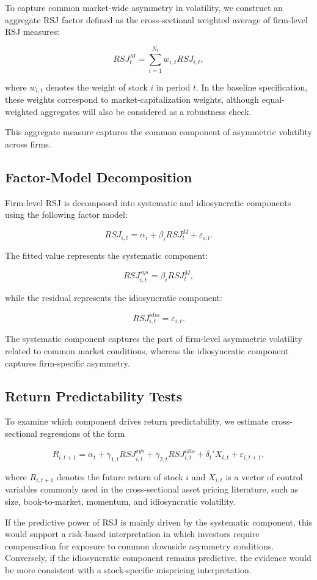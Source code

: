 \documentclass[11pt]{article}
\begin{document}
To capture common market-wide asymmetry in volatility, we construct an
aggregate RSJ factor defined as the cross-sectional weighted average
of firm-level RSJ measures:

\[
RSJ^M_t =
\sum_{i=1}^{N_t}
w_{i,t} RSJ_{i,t},
\]

where $w_{i,t}$ denotes the weight of stock $i$ in period $t$.
In the baseline specification, these weights correspond to
market-capitalization weights, although equal-weighted aggregates will
also be considered as a robustness check.

This aggregate measure captures the common component of asymmetric
volatility across firms.

\subsection{Factor-Model Decomposition}

Firm-level RSJ is decomposed into systematic and idiosyncratic
components using the following factor model:

\[
RSJ_{i,t} =
\alpha_i +
\beta_i RSJ^M_t +
\varepsilon_{i,t}.
\]

The fitted value represents the systematic component:

\[
RSJ^{sys}_{i,t} =
\beta_i RSJ^M_t,
\]

while the residual represents the idiosyncratic component:

\[
RSJ^{idio}_{i,t} =
\varepsilon_{i,t}.
\]

The systematic component captures the part of firm-level asymmetric
volatility related to common market conditions, whereas the
idiosyncratic component captures firm-specific asymmetry.

\subsection{Return Predictability Tests}

To examine which component drives return predictability, we estimate
cross-sectional regressions of the form

\[
R_{i,t+1} =
\alpha_t +
\gamma_{1,t} RSJ^{sys}_{i,t} +
\gamma_{2,t} RSJ^{idio}_{i,t} +
\delta_t' X_{i,t} +
\varepsilon_{i,t+1},
\]

where $R_{i,t+1}$ denotes the future return of stock $i$ and $X_{i,t}$
is a vector of control variables commonly used in the cross-sectional
asset pricing literature, such as size, book-to-market, momentum, and
idiosyncratic volatility.

If the predictive power of RSJ is mainly driven by the systematic
component, this would support a risk-based interpretation in which
investors require compensation for exposure to common downside
asymmetry conditions. Conversely, if the idiosyncratic component
remains predictive, the evidence would be more consistent with a
stock-specific mispricing interpretation.


\end{document}
